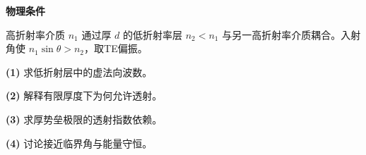 \textbf{物理条件}\par 高折射率介质 \(n_1\) 通过厚 \(d\) 的低折射率层 \(n_2<n_1\) 与另一高折射率介质耦合。入射角使 \(n_1\sin\theta>n_2\)，取TE偏振。
\par\noindent\textbf{(1)} 求低折射层中的虚法向波数。
\par\noindent\textbf{(2)} 解释有限厚度下为何允许透射。
\par\noindent\textbf{(3)} 求厚势垒极限的透射指数依赖。
\par\noindent\textbf{(4)} 讨论接近临界角与能量守恒。
